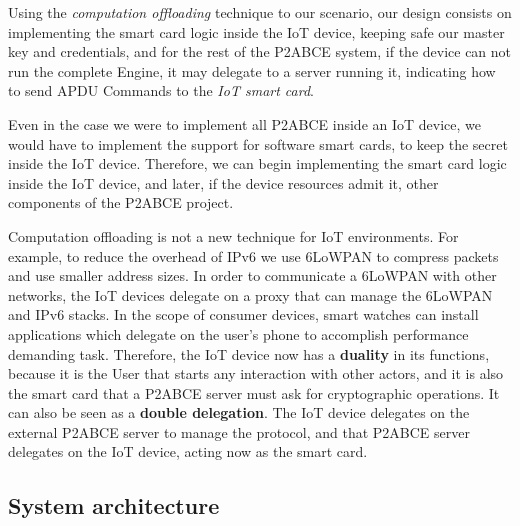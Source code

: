 \documentclass[journal]{IEEEtran}
\begin{document}
Using the \textit{computation offloading} technique to our scenario, our design consists on implementing the smart card logic inside the IoT device, keeping safe our master key and credentials, and for the rest of the P2ABCE system, if the device can not run the complete Engine, it may delegate to a server running it, indicating how to send APDU Commands to the \textit{IoT smart card}.

Even in the case we were to implement all P2ABCE inside an IoT device, we would have to implement the support for software smart cards, to keep the secret inside the IoT device. Therefore, we can begin implementing the smart card logic inside the IoT device, and later, if the device resources admit it, other components of the P2ABCE project.


\hfil

Computation offloading is not a new technique for IoT environments. For example, to reduce the overhead of IPv6 we use 6LoWPAN to compress packets and use smaller address sizes. In order to communicate a 6LoWPAN with other networks, the IoT devices delegate on a proxy that can manage the 6LoWPAN and IPv6 stacks. In the scope of consumer devices, smart watches can install applications which delegate on the user's phone to accomplish performance demanding task. 
Therefore, the IoT device now has a \textbf{duality} in its functions, because it is the User that starts any interaction with other actors, and it is also the smart card that a P2ABCE server must ask for cryptographic operations. It can also be seen as a \textbf{double delegation}. The IoT device delegates on the external P2ABCE server to manage the protocol, and that P2ABCE server delegates on the IoT device, acting now as the smart card.



\subsection{System architecture}
\end{document}
